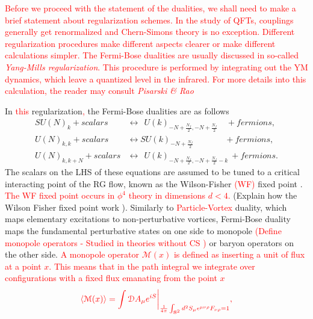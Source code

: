 \textcolor{red}{Before we proceed with the statement of the dualities, we shall need to make a brief statement about regularization schemes. In the study of QFTs, couplings generally get renormalized and Chern-Simons theory is no exception. Different regularization procedures make different aspects clearer or make different calculations simpler. The Fermi-Bose dualities are usually discussed in so-called \textit{Yang-Mills regularization}. This procedure is performed by integrating out the YM dynamics, which leave a quantized level in the infrared. For more details into this calculation, the reader may consult \textit{Pisarski \& Rao} \cite{PhysRevD.32.2081}}

        In \textcolor{red}{this} regularization\textcolor{red}{,} the Fermi-Bose dualities are as follows \cite{Aharony:2015mjs} 
            \begin{align}
                SU(N)_k + scalars &\longleftrightarrow \ \ U(k)_{-N +\frac{N_f}{2}, -N + \frac{N_f}{2}} \quad + fermions,  \\
                U(N)_{k,k} + scalars &\longleftrightarrow SU(k)_{-N +\frac{N_f}{2}}\qquad \ \ \ \quad+ fermions,  \\
                U(N)_{k,k+N} + scalars &\longleftrightarrow \ \ U(k)_{-N +\frac{N_f}{2}, -N + \frac{N_f}{2}-k} \ + fermions.  
            \end{align}
            The scalars on the LHS of these equations are assumed to be tuned to a critical interacting point of the RG flow, known as the Wilson-Fisher \textcolor{red}{(WF)} fixed point \cite{Wilson:1971dc}. \textcolor{red}{The WF fixed point occurs in $\phi^4$ theory in dimensions $d<4$. }(Explain how the Wilson Fisher fixed point work  ). Similarly to \textcolor{red}{Particle-Vortex} duality, which maps elementary excitations to non-perturbative vortices, Fermi-Bose duality maps the fundamental perturbative states on one side to monopole \textcolor{red}{(Define monopole operators - Studied in theories without CS \cite{Borokhov:2002ib, Borokhov:2002cg, Pufu:2013eda, Pufu:2013vpa})}  or baryon operators on the other side. \textcolor{red}{A monopole operator $\mathcal{M}(x)$ is defined as inserting a unit of flux at a point $x$. This means that in the path integral we integrate over configurations with a fixed flux emanating from the point $x$} \\
\begin{align}
    \textcolor{red}{ \langle \mathcal{M}(x) \rangle = \int \mathcal{D}A_{\mu} e^{i S}\bigg |_{\frac{1}{4\pi} \int_{\textbf{S}^2} d^2S_{\mu} \epsilon^{\mu \nu \rho}F_{\nu \rho} =1}, }
\end{align}
